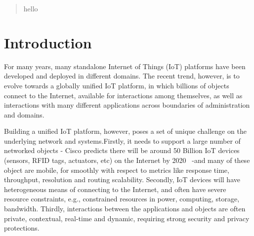 \begin{abstract}
hello
\end{abstract}

\section{Introduction}
For many years, many standalone Internet of Things (IoT) platforms have been developed and deployed in different domains. The recent trend, however, is to evolve towards a globally unified IoT platform, in which billions of objects connect to the Internet, available for interactions among themselves, as well as interactions with many different applications across boundaries of administration and domains. 

Building a unified IoT platform, however, poses a set of unique challenge on the underlying network and systems.Firstly, it needs to support a large number of networked objects - Cisco predicts there will be around 50 Billion IoT devices (sensors, RFID tags, actuators, etc) on the Internet by 2020 ~\cite{ciscovisual}-and many of these object are mobile, for smoothly with respect to metrics like response time, throughput, resolution and routing scalability. Secondly, IoT devices will have heterogeneous means of connecting to the Internet, and often have severe resource constraints, e.g., constrained resources in power, computing, storage, bandwidth. Thirdly, interactions between the applications and objects are often private, contextual, real-time and dynamic, requiring strong security and privacy  protections. 
